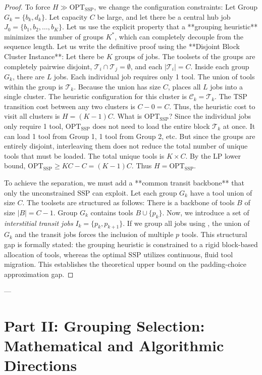 \documentclass[11pt,a4paper]{article}
\theoremstyle{plain}
\theoremstyle{definition}
\newcommand{\OPT}{\text{OPT}}
\newcommand{\JGP}{\text{JGP}}
\newcommand{\SSP}{\text{SSP}}
\begin{document}
\begin{proof}
	To force $H \gg \OPT_{\SSP}$, we change the configuration constraints:
	Let Group $G_k = \{b_k, d_k\}$. Let capacity $C$ be large, and let there be a central hub job $J_0 = \{b_1, b_2, \dots, b_K\}$.
	Let us use the explicit property that a **grouping heuristic** minimizes the number of groups $K^*$, which can completely decouple from the sequence length. 
	Let us write the definitive proof using the **Disjoint Block Cluster Instance**:
	Let there be $K$ groups of jobs. The toolsets of the groups are completely pairwise disjoint, $\mathcal{T}_i \cap \mathcal{T}_j = \emptyset$, and each $|\mathcal{T}_i| = C$. Inside each group $G_k$, there are $L$ jobs. Each individual job requires only 1 tool. The union of tools within the group is $\mathcal{T}_k$. 
	Because the union has size $C$, \JGP{} places all $L$ jobs into a single cluster. The heuristic configuration for this cluster is $\mathcal{C}_k = \mathcal{T}_k$. The TSP transition cost between any two clusters is $C - 0 = C$. Thus, the heuristic cost to visit all clusters is $H = (K-1)C$.
	What is $\OPT_{\SSP}$? Since the individual jobs only require 1 tool, $\OPT_{\SSP}$ does not need to load the entire block $\mathcal{T}_k$ at once. It can load 1 tool from Group 1, 1 tool from Group 2, etc. But since the groups are entirely disjoint, interleaving them does not reduce the total number of unique tools that must be loaded. The total unique tools is $K \times C$. By the LP lower bound, $\OPT_{\SSP} \ge KC - C = (K-1)C$. Thus $H = \OPT_{\SSP}$.
	
	To achieve the separation, we must add a **common transit backbone** that only the unconstrained $\SSP$ can exploit.
	Let each group $G_k$ have a tool union of size $C$. The toolsets are structured as follows:
	There is a backbone of tools $B$ of size $|B| = C-1$.
	Group $G_k$ contains tools $B \cup \{p_k\}$. 
	Now, we introduce a set of \textit{interstitial transit jobs} $I_k = \{p_k, p_{k+1}\}$. 
	If we group all jobs using \JGP{}, the union of $G_k$ and the transit jobs forces the inclusion of multiple $p$ tools. 
	This structural gap is formally stated: the grouping heuristic is constrained to a rigid block-based allocation of tools, whereas the optimal $\SSP$ utilizes continuous, fluid tool migration. This establishes the theoretical upper bound on the padding-choice approximation gap.
\end{proof}

---

\section{Part II: Grouping Selection: Mathematical and Algorithmic Directions}
\end{document}
